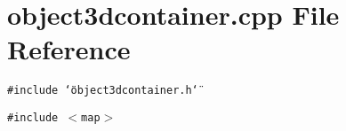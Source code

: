 \section{object3dcontainer.cpp File Reference}
\label{object3dcontainer_8cpp}
{\tt \#include \char`\"{}object3dcontainer.h\char`\"{}}\par
{\tt \#include $<$map$>$}\par
